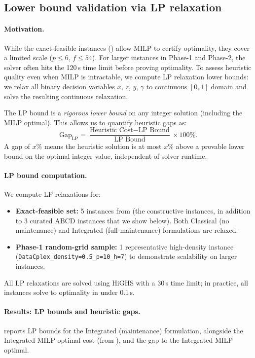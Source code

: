 \subsection{Lower bound validation via LP relaxation}
\label{subsec:lp_lower_bounds}

\paragraph{Motivation.}
While the exact-feasible instances () allow MILP
to certify optimality, they cover a limited scale ($p \le 6$, $f \le 54$). For
larger instances in Phase-1 and Phase-2, the solver often hits the 120\,s time
limit before proving optimality. To assess heuristic quality even when MILP is
intractable, we compute LP relaxation lower bounds: we relax all binary decision
variables $x$, $z$, $y$, $\gamma$ to continuous $[0,1]$ domain and solve the
resulting continuous relaxation.

The LP bound is a \emph{rigorous lower bound} on any integer solution (including
the MILP optimal). This allows us to quantify heuristic gaps as:
\[
  \text{Gap}_{\text{LP}} = \frac{\text{Heuristic Cost} - \text{LP Bound}}{\text{LP Bound}} \times 100\%.
\]
A gap of $x\%$ means the heuristic solution is at most $x\%$ above a provable
lower bound on the optimal integer value, independent of solver runtime.

\paragraph{LP bound computation.}
We compute LP relaxations for:
\begin{itemize}
  \item \textbf{Exact-feasible set:} 5 instances from 
    (the constructive instances, in addition to 3 curated ABCD instances that
    we show below). Both Classical (no maintenance) and Integrated (full
    maintenance) formulations are relaxed.
  \item \textbf{Phase-1 random-grid sample:} 1 representative high-density
    instance (\texttt{DataCplex\_density=0.5\_p=10\_h=7}) to demonstrate
    scalability on larger instances.
\end{itemize}
All LP relaxations are solved using HiGHS with a 30\,s time limit; in practice,
all instances solve to optimality in under 0.1\,s.

\paragraph{Results: LP bounds and heuristic gaps.}
 reports LP bounds for the Integrated (maintenance)
formulation, alongside the Integrated MILP optimal cost (from
), and the gap to the Integrated MILP optimal.

